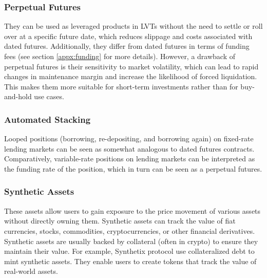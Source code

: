 \subsubsection{Perpetual Futures}
They can be used as leveraged products in LVTs without the need to settle or roll over at a specific future date, which reduces slippage and costs associated with dated futures. Additionally, they differ from dated futures in terms of funding fees (see section \ref{appx:funding} for more details). However, a drawback of perpetual futures is their sensitivity to market volatility, which can lead to rapid changes in maintenance margin and increase the likelihood of forced liquidation. This makes them more suitable for short-term investments rather than for buy-and-hold use cases.

\subsubsection{Automated Stacking}\label{appx:looping}
Looped positions (\ie borrowing, re-depositing, and borrowing again) on fixed-rate lending markets can be seen as somewhat analogous to dated futures contracts. Comparatively, variable-rate positions on lending markets can be interpreted as the funding rate of the position, which in turn can be seen as a perpetual futures.

\subsubsection{Synthetic Assets}
These assets allow users to gain exposure to the price movement of various assets without directly owning them. Synthetic assets can track the value of fiat currencies, stocks, commodities, cryptocurrencies, or other financial derivatives. Synthetic assets are usually backed by collateral (often in crypto) to ensure they maintain their value. For example, Synthetix protocol use collateralized debt to mint synthetic assets. They enable users to create tokens that track the value of real-world assets.

